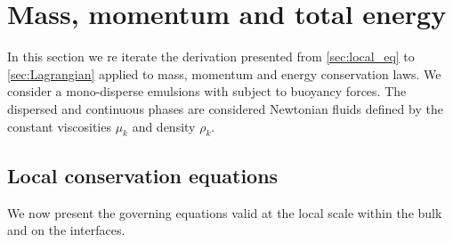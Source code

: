 \section{Mass, momentum and total energy}
\label{ap:hypothesis}
In this section we re iterate the derivation presented from \ref{sec:local_eq} to \ref{sec:Lagrangian} applied to mass, momentum and energy conservation laws. 
We consider a mono-disperse emulsions with subject to buoyancy forces. 
The dispersed and continuous phases are considered Newtonian fluids defined by the constant viscosities $\mu_k$ and density $\rho_k$.


\subsection{Local conservation equations}

We now present the governing equations valid at the local scale within the bulk and on the interfaces. 

